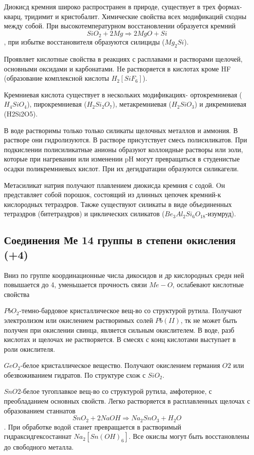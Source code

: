 \documentclass[11pt]{article}
\begin{document}
Диокисд кремния широко распространен в природе, существует в трех формах-
кварц, тридимит и кристобалит. Химические свойства всех модификаций сходны между
собой. При высокотемпературном восстановлении образуется кремний
$$SiO_2+2Mg \Rightarrow 2MgO+Si$$, при избытке восстановителя образуются силициды ($Mg_2Si$).

Проявляет кислотные свойства в реакциях с расплавами и растворами щелочей,
основными оксидами и карбонатами. Hе растворяется в кислотах кроме HF (образование
комплексной кислоты $H_2[SiF_6]$).

Кремниевая кислота существует в нескольких модификациях- ортокремниевая
($H_4SiO_4$), пирокремниевая ($H_2Si_2O_7$), метакремниевая ($H_2SiO_3$) и дикремниевая (H2Si2O5).

В воде растворимы только только силикаты щелочных металлов и аммония. В растворе
они гидролизуются. В растворе присутствует смесь полисиликатов. При подкислении
полисиликатные анионы образуют коллоидные растворы или золи, которые при
нагревании или изменении pH могут превращаться в студенистые осадки поликремниевых
кислот. При их дегидратации образуются силикагели.

Метасиликат натрия получают плавлением диокисда кремния с содой. Oн
представляет собой порошок, состоящий из длинных цепочек кремний-к кислородных
тетраэдров. Также существуют силикаты в виде объединенных тетраэдров (битетраэдров)
и циклических силикатов ($Be_3Al_2Si_6O_{18}$-изумруд).

\subsection{Соединения Ме 14 группы в степени окисления (+4)}

Вниз по группе координационные числа дикосидов и др кислородных средн ней
повышается  до 4, уменьшается прочность связи $Me-O$, ослабевают кислотные свойства

$PbO_2$-темно-бардовое кристаллическое вещ-во со структурой рутила. Получают
электролизом или окислением растворимых солей $Pb(II)$, тк не может быть получен при
окислении свинца, является сильным окислителем. В воде, разб кислотах и щелочах не
растворяется. В смесях с конц кислотами выступает в роли окислителя.

$GeO_2$-белое кристаллическое вещество. Получают окислением германия $O2$ или
обезвоживанием гидратов. По структуре схож с $SiO_2$.

$SnO2$-белое тугоплавкое вещ-во со структурой рутила, амфотерное, с преобладанием
основных свойств. Легко растворяется в расплавленных щелочах с образованием
станнатов $$SnO_2+2NaOH\Rightarrow Na_2SnO_3+H_2O$$. При обработке водой станет превращается в
растворимый гидраксидгексостаннат $Na_2[Sn(OH)_6]$. Все окислы могут быть восстановлены
до свободного металла.
\end{document}
